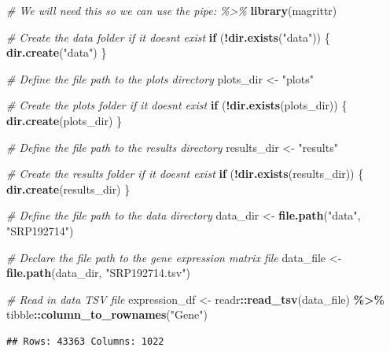 \documentclass[
]{article}
\newenvironment{Shaded}{\begin{snugshade}}{\end{snugshade}}
\newcommand{\CommentTok}[1]{\textcolor[rgb]{0.56,0.35,0.01}{\textit{#1}}}
\newcommand{\ControlFlowTok}[1]{\textcolor[rgb]{0.13,0.29,0.53}{\textbf{#1}}}
\newcommand{\FunctionTok}[1]{\textcolor[rgb]{0.13,0.29,0.53}{\textbf{#1}}}
\newcommand{\NormalTok}[1]{#1}
\newcommand{\OtherTok}[1]{\textcolor[rgb]{0.56,0.35,0.01}{#1}}
\newcommand{\SpecialCharTok}[1]{\textcolor[rgb]{0.81,0.36,0.00}{\textbf{#1}}}
\newcommand{\StringTok}[1]{\textcolor[rgb]{0.31,0.60,0.02}{#1}}
\begin{document}
\begin{Shaded}
\begin{Highlighting}[]
\CommentTok{\# We will need this so we can use the pipe: \%\textgreater{}\%}
\FunctionTok{library}\NormalTok{(magrittr)}

\CommentTok{\# Create the data folder if it doesn\textquotesingle{}t exist}
\ControlFlowTok{if}\NormalTok{ (}\SpecialCharTok{!}\FunctionTok{dir.exists}\NormalTok{(}\StringTok{"data"}\NormalTok{)) \{}
  \FunctionTok{dir.create}\NormalTok{(}\StringTok{"data"}\NormalTok{)}
\NormalTok{\}}

\CommentTok{\# Define the file path to the plots directory}
\NormalTok{plots\_dir }\OtherTok{\textless{}{-}} \StringTok{"plots"}

\CommentTok{\# Create the plots folder if it doesn\textquotesingle{}t exist}
\ControlFlowTok{if}\NormalTok{ (}\SpecialCharTok{!}\FunctionTok{dir.exists}\NormalTok{(plots\_dir)) \{}
  \FunctionTok{dir.create}\NormalTok{(plots\_dir)}
\NormalTok{\}}

\CommentTok{\# Define the file path to the results directory}
\NormalTok{results\_dir }\OtherTok{\textless{}{-}} \StringTok{"results"}

\CommentTok{\# Create the results folder if it doesn\textquotesingle{}t exist}
\ControlFlowTok{if}\NormalTok{ (}\SpecialCharTok{!}\FunctionTok{dir.exists}\NormalTok{(results\_dir)) \{}
  \FunctionTok{dir.create}\NormalTok{(results\_dir)}
\NormalTok{\}}

\CommentTok{\# Define the file path to the data directory}
\NormalTok{data\_dir }\OtherTok{\textless{}{-}} \FunctionTok{file.path}\NormalTok{(}\StringTok{"data"}\NormalTok{, }\StringTok{"SRP192714"}\NormalTok{)}

\CommentTok{\# Declare the file path to the gene expression matrix file}
\NormalTok{data\_file }\OtherTok{\textless{}{-}} \FunctionTok{file.path}\NormalTok{(data\_dir, }\StringTok{"SRP192714.tsv"}\NormalTok{)}

\CommentTok{\# Read in data TSV file}
\NormalTok{expression\_df }\OtherTok{\textless{}{-}}\NormalTok{ readr}\SpecialCharTok{::}\FunctionTok{read\_tsv}\NormalTok{(data\_file) }\SpecialCharTok{\%\textgreater{}\%}
\NormalTok{  tibble}\SpecialCharTok{::}\FunctionTok{column\_to\_rownames}\NormalTok{(}\StringTok{"Gene"}\NormalTok{)}
\end{Highlighting}
\end{Shaded}

\begin{verbatim}
## Rows: 43363 Columns: 1022
\end{verbatim}
\end{document}

